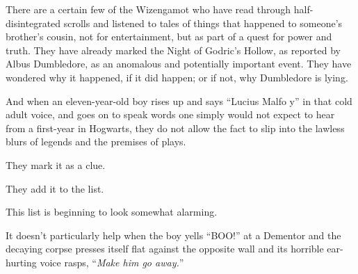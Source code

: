 There are a certain few of the Wizengamot who have read through half-disintegrated scrolls and listened to tales of things that happened to someone's brother's cousin, not for entertainment, but as part of a quest for power and truth. They have already marked the Night of Godric's Hollow, as reported by Albus Dumbledore, as an anomalous and potentially important event. They have wondered why it happened, if it did happen; or if not, why Dumbledore is lying.

And when an eleven-year-old boy rises up and says ``Lucius Malfo y'' in that cold adult voice, and goes on to speak words one simply would not expect to hear from a first-year in Hogwarts, they do not allow the fact to slip into the lawless blurs of legends and the premises of plays.

They mark it as a clue.

They add it to the list.

This list is beginning to look somewhat alarming.

It doesn't particularly help when the boy yells ``BOO!'' at a Dementor and the decaying corpse presses itself flat against the opposite wall and its horrible ear-hurting voice rasps, ``\emph{Make him go away.}''
